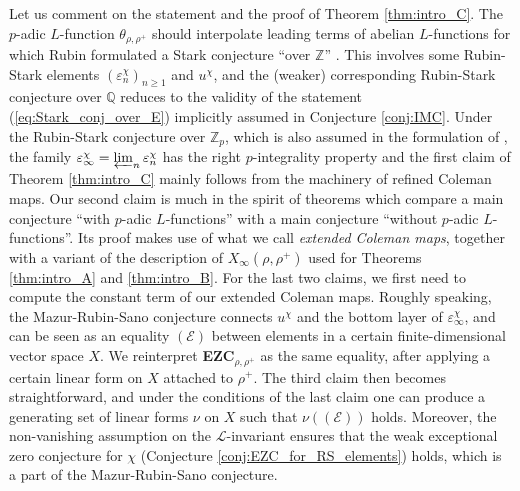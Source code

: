 \documentclass[12pt]{amsart}
\newcommand\bZ{\mathbb{Z}}
\newcommand\bQ{\mathbb{Q}}
\newcommand\Zp{{\mathbb{Z}_p}}
\newcommand\cE{\mathcal{E}}
\newcommand\cL{\mathcal{L}}
\theoremstyle{defstyle}
\theoremstyle{thmstyle}
\begin{document}
Let us comment on the statement and the proof of Theorem \ref{thm:intro_C}. The $p$-adic $L$-function $\theta_{\rho,\rho^+}$ should interpolate leading terms of abelian $L$-functions for which Rubin formulated a Stark conjecture ``over $\bZ$'' \cite{rubinstark}. This involves some Rubin-Stark elements $(\varepsilon_n^{\chi})_{n\geq 1}$ and $u^\chi$, and the (weaker) corresponding Rubin-Stark conjecture over $\bQ$ reduces to the validity of the statement (\ref{eq:Stark_conj_over_E}) implicitly assumed in Conjecture \ref{conj:IMC}. Under the Rubin-Stark conjecture over $\Zp$, which is also assumed in the formulation of \cite{BKSANT}, the family $\varepsilon_\infty^\chi=\varprojlim_n \varepsilon_n^\chi$ has the right $p$-integrality property and the first claim of Theorem \ref{thm:intro_C} mainly follows from the machinery of refined Coleman maps. Our second claim is much in the spirit of theorems which compare a main conjecture ``with $p$-adic $L$-functions'' with a main conjecture ``without $p$-adic $L$-functions''. Its proof makes use of what we call \emph{extended Coleman maps}, together with a variant of the description of $X_\infty(\rho,\rho^+)$ used for Theorems \ref{thm:intro_A} and \ref{thm:intro_B}. For the last two claims, we first need to compute the constant term of our extended Coleman maps. Roughly speaking, the Mazur-Rubin-Sano conjecture connects $u^\chi$ and the bottom layer of $\varepsilon_\infty^\chi$, and can be seen as an equality $(\cE)$ between elements in a certain finite-dimensional vector space $X$. We reinterpret \textbf{EZC}$_{\rho,\rho^+}$ as the same equality, after applying a certain linear form on $X$ attached to $\rho^+$. The third claim then becomes straightforward, and under the conditions of the last claim one can produce a generating set of linear forms $\nu$ on $X$ such that $\nu((\cE))$ holds. Moreover, the non-vanishing assumption on the $\cL$-invariant ensures that the weak exceptional zero conjecture for $\chi$ (Conjecture \ref{conj:EZC_for_RS_elements}) holds, which is a part of the Mazur-Rubin-Sano conjecture.
\end{document}
